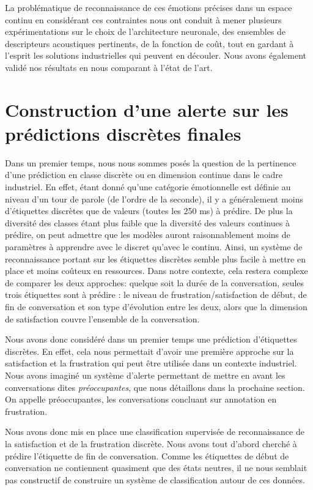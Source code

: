 La problématique de reconnaissance de ces émotions précises dans un espace continu en considérant ces contraintes nous ont conduit à mener plusieurs expérimentations sur le choix de l'architecture neuronale, des ensembles de descripteurs acoustiques pertinents, de la fonction de coût, tout en gardant à l'esprit les solutions industrielles qui peuvent en découler. Nous avons également validé nos résultats en nous comparant à l'état de l'art.

\section{Construction d'une alerte sur les prédictions discrètes finales}

Dans un premier temps, nous nous sommes posés la question de la pertinence d'une prédiction en classe discrète ou en dimension continue dans le cadre industriel.
En effet, étant donné qu'une catégorie émotionnelle est définie au niveau d'un tour de parole (de l'ordre de la seconde), il y a généralement moins d'étiquettes discrètes que de valeurs (toutes les 250 ms) à prédire.
De plus la diversité des classes étant plus faible que la diversité des valeurs continues à prédire, on peut admettre que les modèles auront raisonnablement moins de paramètres à apprendre avec le discret qu'avec le continu.
Ainsi, un système de reconnaissance portant sur les étiquettes discrètes semble plus facile à mettre en place et moins coûteux en ressources.
Dans notre contexte, cela restera complexe de comparer les deux approches:
quelque soit la durée de la conversation, seules trois étiquettes sont à prédire : le niveau de frustration/satisfaction de début, de fin de conversation et son type d'évolution entre les deux, alors que la dimension de satisfaction couvre l'ensemble de la conversation.

Nous avons donc considéré dans un premier temps une prédiction d'étiquettes discrètes. En effet, cela nous permettait d'avoir une première approche sur la satisfaction et la frustration qui peut être utilisée dans un contexte industriel. Nous avons imaginé un système d'alerte permettant de mettre en avant les conversations dites \emph{préoccupantes}, que nous détaillons dans la prochaine section. On appelle préoccupantes, les conversations concluant sur annotation en frustration.

Nous avons donc mis en place une classification supervisée de reconnaissance de la satisfaction et de la frustration discrète. Nous avons tout d'abord cherché à prédire l'étiquette de fin de conversation. Comme les étiquettes de début de conversation ne contiennent quasiment que des états neutres, il ne nous semblait pas constructif de construire un système de classification autour de ces données.

